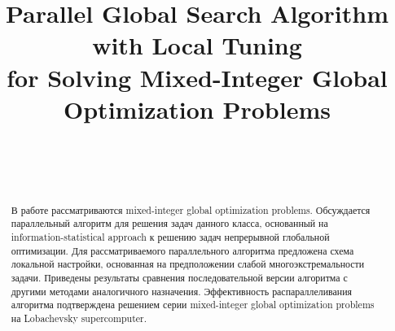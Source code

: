 \documentclass[
11pt,%
tightenlines,%
twoside,%
onecolumn,%
nofloats,%
nobibnotes,%
nofootinbib,%
superscriptaddress,%
noshowpacs,%
centertags]%
{revtex4}
\begin{document}

\title{Parallel Global Search Algorithm with Local Tuning\\ 
for Solving Mixed-Integer Global Optimization Problems}

\author{~}


\author{~}




\begin{abstract} %
В работе рассматриваются mixed-integer global optimization problems. Обсуждается параллельный алгоритм для решения задач данного класса, основанный на information-statistical approach к решению задач непрерывной глобальной оптимизации. Для рассматриваемого параллельного алгоритма предложена схема локальной настройки, основанная на предположении слабой многоэкстремальности задачи. 
Приведены результаты сравнения последовательной версии алгоритма с другими методами аналогичного назначения. 
Эффективность распараллеливания алгоритма подтверждена решением серии mixed-integer global optimization problems на Lobachevsky supercomputer. 
\end{abstract}



\maketitle
\end{document}
